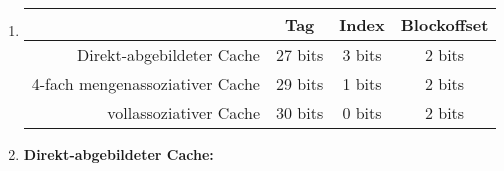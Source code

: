 

\usepackage{tikz}
\usetikzlibrary{arrows,automata}   

\date{Donnerstag 28.05.2020}


    \maketitle
    \thispagestyle{fancy}


    \begin{enumerate}[label=\alph*)]

        \item \hfill \begin{center}
            \begin{tabular}{r|c|c|c}
                        & Tag     & Index  & Blockoffset \\ \hline
                Direkt-abgebildeter Cache  & 27 bits & 3 bits & 2 bits      \\
                4-fach mengenassoziativer Cache  & 29 bits & 1 bits & 2 bits      \\
                vollassoziativer Cache    & 30 bits & 0 bits & 2 bits      
            \end{tabular} 
        \end{center}
        \item \textbf{Direkt-abgebildeter Cache:}
        \\


\end{enumerate}
